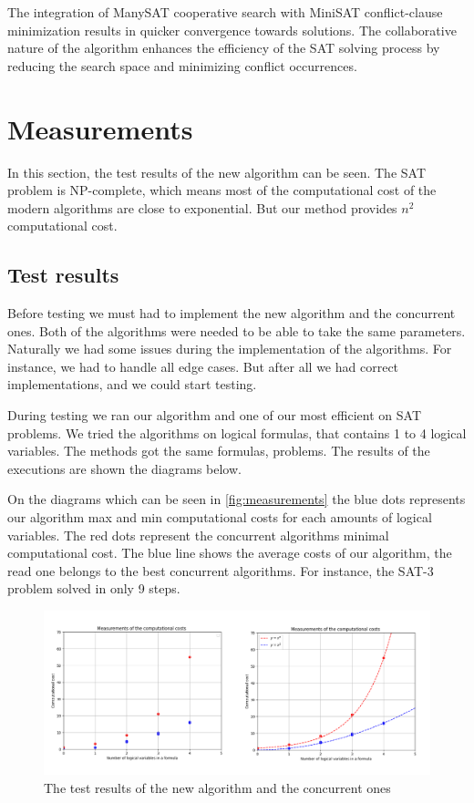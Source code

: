 \documentclass{article}
\begin{document}
The integration of ManySAT cooperative search with MiniSAT conflict-clause minimization results in quicker convergence towards solutions. The collaborative nature of the algorithm enhances the efficiency of the SAT solving process by reducing the search space and minimizing conflict occurrences.

\section{Measurements}
\label{sec:measurements}

In this section, the test results of the new algorithm can be seen. The SAT problem is NP-complete, which means most of the computational cost of the modern algorithms are close to exponential. But our method provides $n^{2}$ computational cost.

\subsection{Test results}
Before testing we must had to implement the new algorithm and the concurrent ones. Both of the algorithms were needed to be able to take the same parameters. Naturally we had some issues during the implementation of the algorithms. For instance, we had to handle all edge cases. But after all we had correct implementations, and we could start testing.

During testing we ran our algorithm and one of our most efficient on SAT problems. We tried the algorithms on logical formulas, that contains 1 to 4 logical variables. The methods got the same formulas, problems. The results of the executions are shown the diagrams below.

On the diagrams which can be seen in \autoref{fig:measurements} the blue dots represents our algorithm max and min computational costs for each amounts of logical variables. The red dots represent the concurrent algorithms minimal computational cost. The blue line shows the average costs of our algorithm, the read one belongs to the best concurrent algorithms. For instance, the SAT-3 problem solved in only 9 steps.

\begin{figure}[h]
    \centering
    \includegraphics[width=1\linewidth]{img/measurements.png}
    \caption{The test results of the new algorithm and the concurrent ones}
	\label{fig:measurements}
\end{figure}
\end{document}
